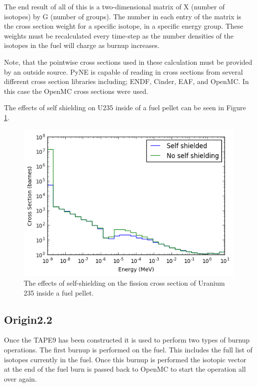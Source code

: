 \documentclass{article}
\begin{document}
The end result of all of this is a two-dimensional matrix of X (number of isotopes) by G (number of groups). The number in each entry of the matrix is the cross section weight for a specific isotope, in a specific energy group. These weights must be recalculated every time-step as the number densities of the isotopes in the fuel will charge as burnup increases.

Note, that the pointwise cross sections used in these calculation must be provided by an outside source. PyNE is capable of reading in cross sections from several different cross section libraries including; ENDF, Cinder, EAF, and OpenMC. In this case the OpenMC cross sections were used.

The effects of self shielding on U235 inside of a fuel pellet can be seen in Figure \ref{fig:index}.
\begin{figure}[h]
  \center
  \includegraphics[scale=0.8]{index.png}
  \caption{The effects of self-shielding on the fission cross section of Uranium 235 inside a fuel pellet.}
  \label{fig:index}
\end{figure}

\subsection{Origin2.2}
Once the TAPE9 has been constructed it is used to perform two types of burnup operations. The first burnup is performed on the fuel. This includes the full list of isotopes currently in the fuel. Once this burnup is performed the isotopic vector at the end of the fuel burn is passed back to OpenMC to start the operation all over again.
\end{document}
